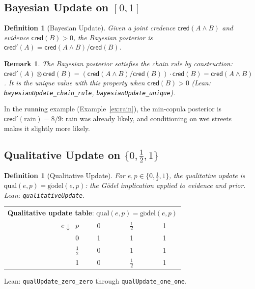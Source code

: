 \documentclass[11pt,a4paper]{article}
\newtheorem{definition}[theorem]{Definition}
\newtheorem{remark}[theorem]{Remark}
\newcommand{\cred}{\mathsf{cred}}
\newcommand{\conjc}{\otimes}
\begin{document}
\subsection{Bayesian Update on $[0,1]$}
\label{sec:bayesian}

\begin{definition}[Bayesian Update]
\label{def:bayesian}
Given a joint credence $\cred(A \land B)$ and evidence
$\cred(B) > 0$, the \emph{Bayesian posterior} is
$\cred'(A) = \cred(A \land B) / \cred(B)$.
\end{definition}

\begin{remark}
\label{prop:bayes-chain}
The Bayesian posterior satisfies the chain rule by construction:
$\cred'(A) \conjc \cred(B) = (\cred(A \land B) / \cred(B))
\cdot \cred(B) = \cred(A \land B)$.
It is the unique value with this property when $\cred(B) > 0$
(Lean: \texttt{bayesianUpdate\_chain\_rule},
\texttt{bayesianUpdate\_unique}).
\end{remark}

In the running example (Example~\ref{ex:rain}), the min-copula
posterior is $\cred'(\text{rain}) = 8/9$: rain was already
likely, and conditioning on wet streets makes it slightly more
likely.

\subsection{Qualitative Update on $\{0, \tfrac{1}{2}, 1\}$}

\begin{definition}[Qualitative Update]
\label{def:qual-update}
For $e, p \in \{0, \tfrac{1}{2}, 1\}$, the \emph{qualitative
update} is $\mathrm{qual}(e, p) = \mathrm{g\ddot{o}del}(e, p)$:
the G\"odel implication applied to evidence and prior.
Lean: \texttt{qualitativeUpdate}.
\end{definition}

\begin{center}
\small
\begin{tabular}{r|ccc}
\multicolumn{4}{c}{\textbf{Qualitative update table}:
$\mathrm{qual}(e, p) = \mathrm{g\ddot{o}del}(e, p)$} \\
$e \!\downarrow\;\; p$ & 0 & $\tfrac{1}{2}$ & 1 \\
\hline
0 & 1 & 1 & 1 \\
$\tfrac{1}{2}$ & 0 & 1 & 1 \\
1 & 0 & $\tfrac{1}{2}$ & 1
\end{tabular}
\normalsize
\end{center}
\smallskip
\noindent
Lean: \texttt{qualUpdate\_zero\_zero} through
\texttt{qualUpdate\_one\_one}.
\end{document}
